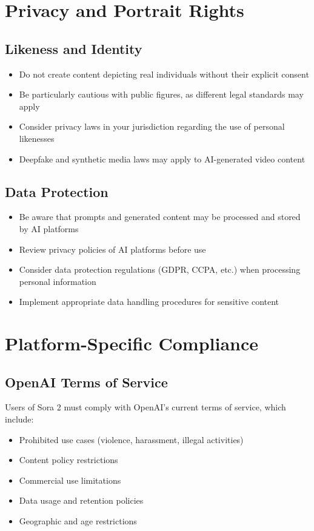\section{Privacy and Portrait Rights}

\subsection{Likeness and Identity}
\begin{itemize}
\item Do not create content depicting real individuals without their explicit consent
\item Be particularly cautious with public figures, as different legal standards may apply
\item Consider privacy laws in your jurisdiction regarding the use of personal likenesses
\item Deepfake and synthetic media laws may apply to AI-generated video content
\end{itemize}

\subsection{Data Protection}
\begin{itemize}
\item Be aware that prompts and generated content may be processed and stored by AI platforms
\item Review privacy policies of AI platforms before use
\item Consider data protection regulations (GDPR, CCPA, etc.) when processing personal information
\item Implement appropriate data handling procedures for sensitive content
\end{itemize}

\section{Platform-Specific Compliance}

\subsection{OpenAI Terms of Service}
Users of Sora 2 must comply with OpenAI's current terms of service, which include:
\begin{itemize}
\item Prohibited use cases (violence, harassment, illegal activities)
\item Content policy restrictions
\item Commercial use limitations
\item Data usage and retention policies
\item Geographic and age restrictions
\end{itemize}

